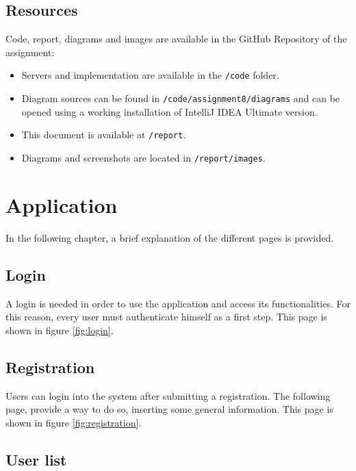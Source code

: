 \documentclass[a4paper]{report}
\begin{document}
	\section{Resources}
	\label{sec:resources}
	
	Code, report, diagrams and images are available in the GitHub Repository \cite{site:githubrepository} of the assignment:
	
	\begin{itemize}
		\item Servers and implementation are available in the \texttt{/code} folder.
		\item Diagram sources can be found in \texttt{/code/assignment8/diagrams} and can be opened using a working installation of IntelliJ IDEA Ultimate version.
		\item This document is available at \texttt{/report}.
		\item Diagrams and screenshots are located in \texttt{/report/images}.
	\end{itemize}

	\chapter{Application}
	\label{chap:application}
	
	In the following chapter, a brief explanation of the different pages is provided.
	
	\section{Login}
	\label{sec:login}
	
	A login is needed in order to use the application and access its functionalities. For this reason, every user must authenticate himself as a first step. This page is shown in figure \ref{fig:login}.
	
	\section{Registration}
	\label{sec:registration}
	
	Users can login into the system after submitting a registration. The following page, provide a way to do so, inserting some general information. This page is shown in figure \ref{fig:registration}.
	
	\section{User list}
	\label{sec:user_list}
\end{document}
